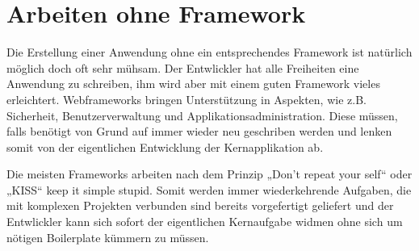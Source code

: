 \section{Arbeiten ohne Framework}
Die Erstellung einer Anwendung ohne ein entsprechendes Framework ist
natürlich möglich doch oft sehr mühsam. Der Entwlickler hat alle Freiheiten eine
Anwendung zu schreiben, ihm wird aber mit einem guten Framework vieles
erleichtert. Webframeworks bringen Unterstützung in Aspekten, wie z.B.
Sicherheit, Benutzerverwaltung und Applikationsadministration. Diese müssen, 
falls benötigt von Grund auf immer wieder neu geschriben werden und lenken
somit von der eigentlichen Entwicklung der Kernapplikation ab. 

Die meisten Frameworks arbeiten nach dem Prinzip „Don't repeat your self“ oder 
„KISS“ keep it simple stupid. Somit werden immer wiederkehrende Aufgaben, die 
mit komplexen Projekten verbunden sind bereits vorgefertigt geliefert und der 
Entwlickler kann sich sofort der eigentlichen Kernaufgabe widmen ohne
sich um nötigen Boilerplate kümmern zu müssen.


